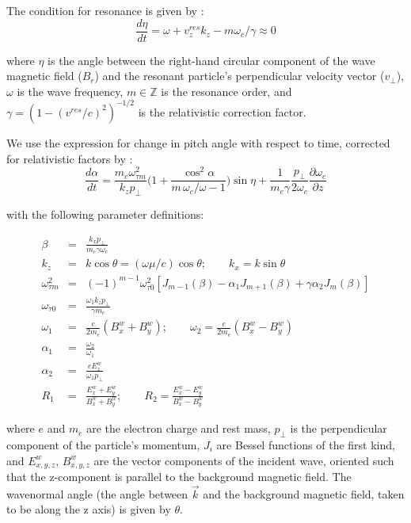 The condition for resonance is given by \cite{Chang1983a}:
\begin{equation}
\frac{d \eta}{dt} = \omega + v_z^{res} k_z - m \omega_c / \gamma \approx 0
\end{equation}

where $\eta$ is the angle between the right-hand circular component of the wave magnetic field ($B_r$) and the resonant particle's perpendicular velocity vector ($v_\perp$), $\omega$ is the wave frequency, $m \in \mathbb Z$ is the resonance order, and $\gamma = (1 - (v^{res}/c)^2)^{-1/2}$ is the relativistic correction factor.

We use the \cite{Bell1984} expression for change in pitch angle with respect to time, corrected for relativistic factors by \cite{Ristic1993, Bortnik2006}:
\begin{equation}
\frac{d\alpha}{dt} = \frac{m_e \omega_{\tau m}^2}{k_z p_\perp} \bigg( 1 + \frac{\cos^2\alpha}{m\,\omega_c / \omega - 1}\bigg)\sin \eta + \frac{1}{m_e \gamma}\frac{p_\perp}{2 \omega_c}\frac{\partial \omega_c}{\partial z}
\label{eqn:bell_dadt}
\end{equation}

with the following parameter definitions:

\begin{eqnarray}
\beta & = &\frac{k_x p_\perp}{m_e \gamma \omega_c} \\
k_z & = & k \cos \theta = (\omega \mu / c) \cos \theta; \qquad k_x = k \sin \theta \\
\omega_{\tau m}^2 & = & (-1)^{m-1}\omega_{\tau 0}^2 [J_{m-1}(\beta) - \alpha_1 J_{m+1}(\beta) + \gamma \alpha_2 J_m(\beta)] \\
\omega_{\tau 0} & = & \frac{\omega_1 k_z p_\perp}{\gamma m_e} \\
\omega_1 & = & \frac{e}{2 m_e} (B_x^w + B_y^w); \qquad \omega_2 = \frac{e}{2 m_e}(B_x^w - B_y^w) \\
\alpha_1 & = & \frac{\omega_2}{\omega_1} \\
\alpha_2 & = & \frac{e E_z^w}{\omega_1 p_\perp} \\
R_1 & = & \frac{E_x^w + E_y^w}{B_x^w + B_y^w}; \qquad R_2 =  \frac{E_x^w - E_y^w}{B_x^w - B_y^w}
\label{eqn:dadt_subparams}
\end{eqnarray}

where $e$ and $m_e$ are the electron charge and rest mass, $p_\perp$ is the perpendicular component of the particle's momentum, $J_i$ are Bessel functions of the first kind, and $E_{x,y,z}^w$, $B_{x,y,z}^w$ are the vector components of the incident wave, oriented such that the z-component is parallel to the background magnetic field. The wavenormal angle (the angle between $\vec{k}$ and the background magnetic field, taken to be along the z axis) is given by $\theta$.

